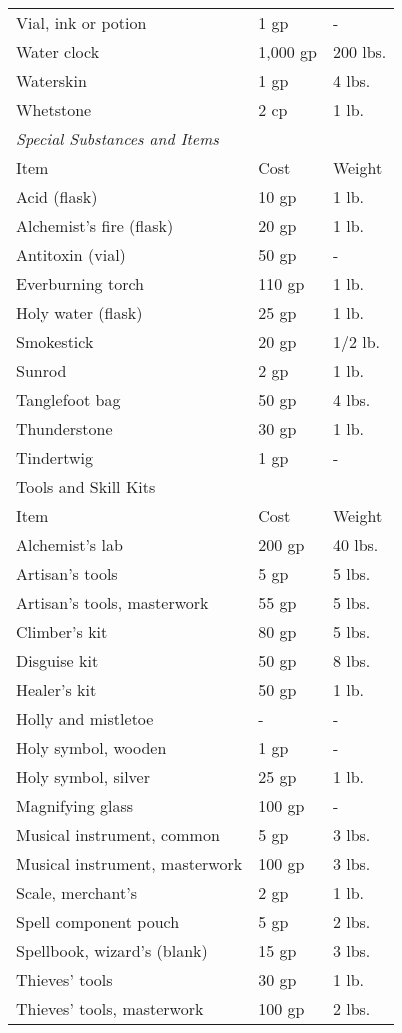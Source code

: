 \begin{table}[]
\begin{tabular}{lll}
 Vial, ink or potion & 1 gp & - \\
 Water clock & 1,000 gp & 200 lbs. \\
 Waterskin & 1 gp & 4 lbs. \\
 Whetstone & 2 cp & 1 lb.\\
\textit{Special Substances and Items} \\
Item & Cost & Weight\\
Acid (flask) & 10 gp & 1 lb. \\
 Alchemist's fire (flask) & 20 gp & 1 lb. \\
 Antitoxin (vial) & 50 gp & - \\
 Everburning torch & 110 gp & 1 lb. \\
 Holy water (flask) & 25 gp & 1 lb. \\
 Smokestick & 20 gp & 1/2 lb. \\
 Sunrod & 2 gp & 1 lb. \\
 Tanglefoot bag & 50 gp & 4 lbs. \\
 Thunderstone & 30 gp & 1 lb. \\
 Tindertwig & 1 gp & -\\
Tools and Skill Kits  \\
 Item & Cost & Weight\\
Alchemist's lab & 200 gp & 40 lbs. \\
 Artisan's tools & 5 gp & 5 lbs. \\
 Artisan's tools, masterwork & 55 gp & 5 lbs. \\
 Climber's kit & 80 gp & 5 lbs. \\
 Disguise kit & 50 gp & 8 lbs. \\
 Healer's kit & 50 gp & 1 lb. \\
 Holly and mistletoe & - & - \\
 Holy symbol, wooden & 1 gp & - \\
 Holy symbol, silver & 25 gp & 1 lb. \\
 Magnifying glass & 100 gp & - \\
 Musical instrument, common & 5 gp & 3 lbs. \\
 Musical instrument, masterwork & 100 gp & 3 lbs. \\
 Scale, merchant's & 2 gp & 1 lb. \\
 Spell component pouch & 5 gp & 2 lbs. \\
 Spellbook, wizard's (blank) & 15 gp & 3 lbs. \\
 Thieves' tools & 30 gp & 1 lb. \\
 Thieves' tools, masterwork & 100 gp & 2 lbs. \\

\end{tabular}
\end{table}
